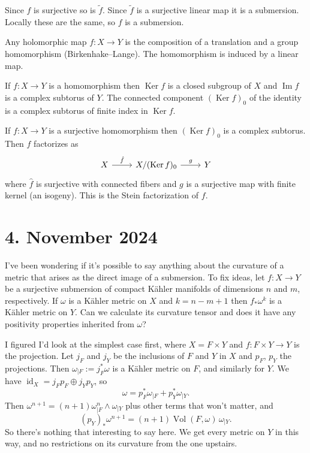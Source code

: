 \documentclass[11pt]{amsart}
\theoremstyle{definition}
\DeclareMathOperator{\Vol}{Vol}
\DeclareMathOperator{\Ker}{Ker}
\DeclareMathOperator{\Img}{Im}
\DeclareMathOperator{\id}{id}
\begin{document}
Since $f$ is surjective so is $\tilde f$.
Since $\tilde f$ is a surjective linear map it is a submersion.
Locally these are the same, so $f$ is a submersion.


Any holomorphic map $f : X \to Y$ is the composition of a translation and a group homomorphism (Birkenhake--Lange).
The homomorphism is induced by a linear map.

If $f : X \to Y$ is a homomorphism then $\Ker f$ is a closed subgroup of $X$ and $\Img f$ is a complex subtorus of $Y$.
The connected component $(\Ker f)_0$ of the identity is a complex subtorus of finite index in $\Ker f$.

If $f : X \to Y$ is a surjective homomorphism then $(\Ker f)_0$ is a complex subtorus.
Then $f$ factorizes as
\[
\begin{tikzcd}
X \ar[r,"\hat f"] &
X / (\Ker f)_0 \ar[r,"g"] &
Y
\end{tikzcd}
\]
where $\hat f$ is surjective with connected fibers and $g$ is a surjective map with finite kernel (an isogeny).
This is the Stein factorization of $f$.



\section{4. November 2024}


I've been wondering if it's possible to say anything about the curvature of a metric that arises as the direct image of a submersion.
To fix ideas, let $f : X \to Y$ be a surjective submersion of compact K\"ahler manifolds of dimensions $n$ and $m$, respectively.
If $\omega$ is a K\"ahler metric on $X$ and $k = n - m + 1$ then $f_*\omega^k$ is a K\"ahler metric on $Y$.
Can we calculate its curvature tensor and does it have any positivity properties inherited from $\omega$?

I figured I'd look at the simplest case first, where $X = F \times Y$ and $f : F \times Y \to Y$ is the projection.
Let $j_F$ and $j_Y$ be the inclusions of $F$ and $Y$ in $X$ and $p_F$, $p_Y$ the projections.
Then $\omega_{|F} := j_F^*\omega$ is a K\"ahler metric on $F$, and similarly for $Y$.
We have $\id_X = j_F p_F \oplus j_Y p_Y$, so
\[
\omega
= p_F^* \omega_{|F} + p_Y^* \omega_{|Y}.
\]
Then $\omega^{n+1} = (n+1)\omega_{|F}^n \wedge \omega_{|Y}$ plus other terms that won't matter, and
\[
(p_Y)_* \omega^{n+1}
= (n+1) \Vol(F, \omega) \, \omega_{|Y}.
\]
So there's nothing that interesting to say here.
We get every metric on $Y$ in this way, and no restrictions on its curvature from the one upstairs.
\end{document}
